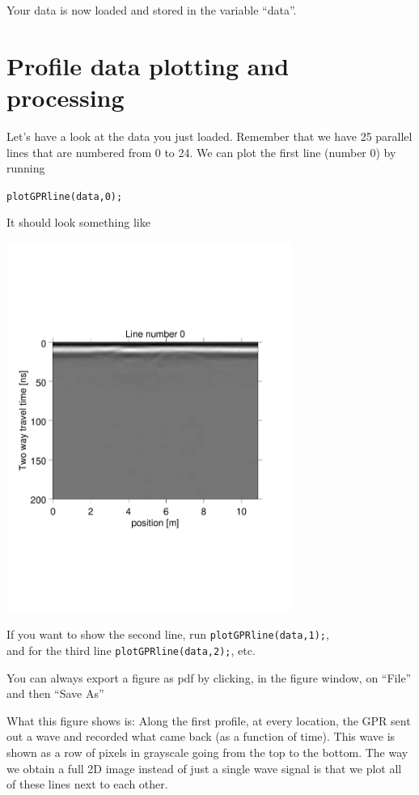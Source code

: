 \documentclass[11pt]{article}
\begin{document}
Your data is now loaded and stored in the variable ``data''.

\section{Profile data plotting and processing}\label{secProfiles}

Let's have a look at the data you just loaded. Remember that we have
25 parallel lines that are numbered from 0 to 24. We can plot the
first line (number 0) by running

\qquad \verb#plotGPRline(data,0);#

It should look something like

\begin{center}
\includegraphics[width=0.7\textwidth, trim = 0.9cm 6cm 2cm
  6.5cm,clip]{figures/GPRline0}
\end{center}

If you want to show the second line, run \verb#plotGPRline(data,1);#,
\\and for the third line \verb#plotGPRline(data,2);#, etc.
 
You can always export a figure as pdf by clicking, in the figure
window, on ``File'' and then ``Save As''

What this figure shows is: Along the first profile, at every location,
the GPR sent out a wave and recorded what came back (as a function of
time). This wave is shown as a row of pixels in grayscale going from
the top to the bottom. The way we obtain a full 2D image instead of
just a single wave signal is that we plot all of these lines next to
each other.
\end{document}
